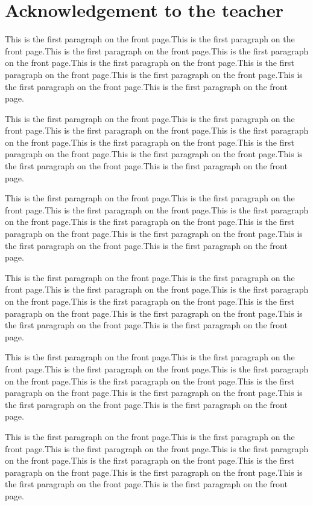 \documentclass{article}
\begin{document}
\section{Acknowledgement to the teacher}
This is the first paragraph on the front page.This is the first paragraph on the front page.This is the first paragraph on the front page.This is the first paragraph on the front page.This is the first paragraph on the front page.This is the first paragraph on the front page.This is the first paragraph on the front page.This is the first paragraph on the front page.This is the first paragraph on the front page.\par
This is the first paragraph on the front page.This is the first paragraph on the front page.This is the first paragraph on the front page.This is the first paragraph on the front page.This is the first paragraph on the front page.This is the first paragraph on the front page.This is the first paragraph on the front page.This is the first paragraph on the front page.This is the first paragraph on the front page.\par
This is the first paragraph on the front page.This is the first paragraph on the front page.This is the first paragraph on the front page.This is the first paragraph on the front page.This is the first paragraph on the front page.This is the first paragraph on the front page.This is the first paragraph on the front page.This is the first paragraph on the front page.This is the first paragraph on the front page.\par
This is the first paragraph on the front page.This is the first paragraph on the front page.This is the first paragraph on the front page.This is the first paragraph on the front page.This is the first paragraph on the front page.This is the first paragraph on the front page.This is the first paragraph on the front page.This is the first paragraph on the front page.This is the first paragraph on the front page.\par
This is the first paragraph on the front page.This is the first paragraph on the front page.This is the first paragraph on the front page.This is the first paragraph on the front page.This is the first paragraph on the front page.This is the first paragraph on the front page.This is the first paragraph on the front page.This is the first paragraph on the front page.This is the first paragraph on the front page.\par
This is the first paragraph on the front page.This is the first paragraph on the front page.This is the first paragraph on the front page.This is the first paragraph on the front page.This is the first paragraph on the front page.This is the first paragraph on the front page.This is the first paragraph on the front page.This is the first paragraph on the front page.This is the first paragraph on the front page.\par
\end{document}
